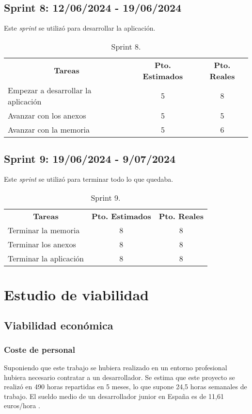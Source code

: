 \subsection{Sprint 8: 12/06/2024 - 19/06/2024 }
Este \textit{sprint} se utilizó para desarrollar la aplicación.
\begin{table}[h]
	\centering
	\begin{tabular}{lcc}
		\multicolumn{1}{c}{\textbf{Tareas}} & \textbf{Pto. Estimados} & \textbf{Pto. Reales}\\
		Empezar a desarrollar la aplicación & 5 & 8 \\
		Avanzar con los anexos & 5 & 5 \\
		Avanzar con la memoria & 5 &6 \\
	\end{tabular}
	\caption{Sprint 8.}
	\label{sprint8}
\end{table}

\subsection{Sprint 9: 19/06/2024 - 9/07/2024 }
Este \textit{sprint} se utilizó para terminar todo lo que quedaba.
\begin{table}[h]
	\centering
	\begin{tabular}{lcc}
		\multicolumn{1}{c}{\textbf{Tareas}} & \textbf{Pto. Estimados} & \textbf{Pto. Reales}\\
		Terminar la memoria & 8 & 8 \\
		Terminar los anexos & 8 & 8 \\
		Terminar la aplicación & 8 &8 \\
	\end{tabular}
	\caption{Sprint 9.}
	\label{sprint9}
\end{table}

\section{Estudio de viabilidad}

\subsection{Viabilidad económica}

\subsubsection{Coste de personal}
Suponiendo que este trabajo se hubiera realizado en un entorno profesional hubiera necesario contratar a un desarrollador. Se estima que este proyecto se realizó en 490 horas repartidas en 5 meses, lo que supone 24,5 horas semanales  de trabajo. El sueldo medio de un desarrollador junior en España es de 11,61 euros/hora \cite{salariomedio}.

